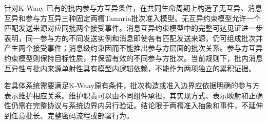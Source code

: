 针对K-Waay \batchreceive 已有的批内参与方互异条件，在共同生命周期上构造了无互异、消息互异和参与方互异三种固定两槽Tamarin批次准入模型。无互异约束模型允许一个匹配发送来源对应同批两个接受事件。消息互异约束模型中的完整可达见证进一步表明，同一参与方的不同发送实例和消息即使各有匹配发送来源，仍可组成批次并产生两个接受事件；消息级约束因而不能推出参与方层面的批次关系。参与方互异约束模型则保持目标性质，并保留有效的不同参与方批次。当前规则下，批内消息互异性与批内来源单射性具有模型内逻辑依赖，不能作为两项独立的累积证据。

若具体系统需要满足K-Waay原有条件，批次构造或准入边界应依据明确的参与方表示维护相应关系。维护职责可以由不同组件承担，其实现方式、表示映射和正确性仍需在完整协议与系统边界内另行验证。结论限于两槽准入抽象和\receiveraccept 事件，不延伸到任意批长、完整密码流程或部署行为。

